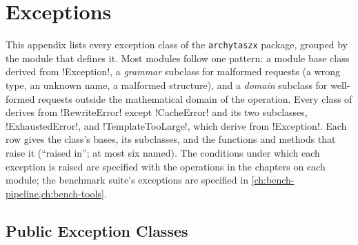 \chapter{Exceptions}\label{app:errors}

This appendix lists every exception class of the \texttt{archytaszx} package, grouped by the module that defines it. Most modules follow one pattern: a module base class derived from \py!Exception!, a \emph{grammar} subclass for malformed requests (a wrong type, an unknown name, a malformed structure), and a \emph{domain} subclass for well-formed requests outside the mathematical domain of the operation. Every class of  derives from \py!RewriteError! except \py!CacheError! and its two subclasses, \py!ExhaustedError!, and \py!TemplateTooLarge!, which derive from \py!Exception!. Each row gives the class's bases, its subclasses, and the functions and methods that raise it (``raised in''; at most six named). The conditions under which each exception is raised are specified with the operations in the chapters on each module; the benchmark suite's exceptions are specified in \cref{ch:bench-pipeline,ch:bench-tools}.

\section{Public Exception Classes}\label{sec:errors-public}

